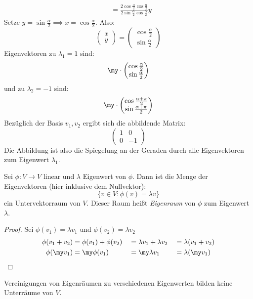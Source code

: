 \documentclass{mycourse}
\begin{document}
\begin{ex}
\begin{itemize}
\begin{align*}
&=\frac {2\cos\frac\alpha2\cos\frac\alpha2}{2\sin\frac\alpha2\cos\frac\alpha2}y
\end{align*}
Setze $y=\sin\frac\alpha2\implies x=\cos\frac\alpha2$.
Also:
\[
\begin{pmatrix}x\\y\end{pmatrix}=\begin{pmatrix}\cos\frac \alpha2\\\sin\frac\alpha2\end{pmatrix}
\]
Eigenvektoren zu $\lambda_1=1$ sind:
\[
\my\cdot \begin{pmatrix}\cos\frac\alpha2\\ \sin\frac\alpha2\end{pmatrix}
\]
und zu $\lambda_2=-1$ sind:
\[
\my\cdot \begin{pmatrix}\cos\frac{\alpha+\pi}2 \\ \sin\frac{\alpha +\pi}2\end{pmatrix}
\]
Bezüglich der Basis $v_1,v_2$ ergibt sich die abbildende Matrix:
\[
\begin{pmatrix}1&0\\0&-1\end{pmatrix}
\]
Die Abbildung ist also die Spiegelung an der Geraden durch alle Eigenvektoren zum Eigenwert $\lambda_1$.
\end{itemize}
\end{ex}

\begin{prop}
\label{prop:10.5}
Sei $\phi:V\to V$ linear und $\lambda$ Eigenwert von $\phi$.
Dann ist die Menge der Eigenvektoren (hier inklusive dem Nullvektor):
\[
\{v\in V:\phi(v)=\lambda v\}
\]
ein Untervektorraum von $V$.
Dieser Raum heißt \emph{Eigenraum} von $\phi$ zum Eigenwert $\lambda$.

\begin{proof}
Sei $\phi(v_1)=\lambda v_1$ und $\phi(v_2)=\lambda v_2$
\begin{alignat*}{3}
	\phi(v_1+v_2)&=\phi(v_1)+\phi(v_2)&&=\lambda v_1+\lambda v_2 &&= \lambda(v_1+v_2)\\
 \phi(\my v_1)&=\my\phi(v_1)&&=\my\lambda v_1&&=\lambda (\my v_1)
\end{alignat*}
\end{proof}
\begin{note}
Vereinigungen von Eigenräumen zu verschiedenen Eigenwerten bilden keine Unterräume von $V$.
\end{note}
\end{prop}
\end{document}
